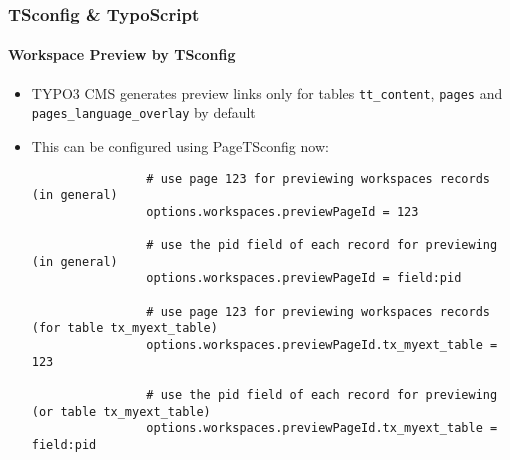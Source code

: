 \begin{frame}[fragile]
	\frametitle{TSconfig \& TypoScript}
	\framesubtitle{Workspace Preview by TSconfig}

	\lstset{basicstyle=\tiny\ttfamily}

	\begin{itemize}

		\item TYPO3 CMS generates preview links only for tables \texttt{tt\_content}, \texttt{pages} and
			\texttt{pages\_language\_overlay} by default

		\item This can be configured using PageTSconfig now:

			\begin{lstlisting}
				# use page 123 for previewing workspaces records (in general)
				options.workspaces.previewPageId = 123

				# use the pid field of each record for previewing (in general)
				options.workspaces.previewPageId = field:pid

				# use page 123 for previewing workspaces records (for table tx_myext_table)
				options.workspaces.previewPageId.tx_myext_table = 123

				# use the pid field of each record for previewing (or table tx_myext_table)
				options.workspaces.previewPageId.tx_myext_table = field:pid
			\end{lstlisting}

	\end{itemize}

\end{frame}

